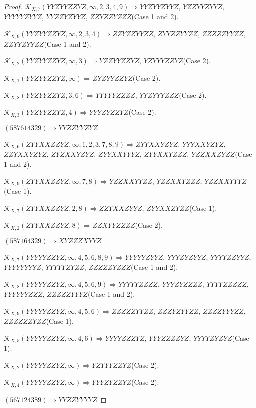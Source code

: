 \documentclass[12pt]{article}
\theoremstyle{plain}
\theoremstyle{definition}
\theoremstyle{remark}
\newcommand{\fancy}[1]{\mathcal{#1}}
\def\K{\fancy{K}}
\begin{document}
\begin{proof}
	$\K_{X,7}(YYZYYZZYZ,\infty,2, 3, 4, 9)\Rightarrow $$YYZYYZYYZ$, $YZZYYZYYZ$, $YYYYYZYYZ$, $YYZZYZYYZ$, $ZZYZZYZZZ$(Case 1 and 2).
	
	$\K_{X,9}(YYZYYZZYZ,\infty,2, 3, 4)\Rightarrow $$ZZYZZYYZZ$, $ZYYZZYYZZ$, $ZZZZZYYZZ$, $ZZYYZYYZZ$(Case 1 and 2).
	
	$\K_{X,2}(YYZYYZZYZ,\infty,3)\Rightarrow $$YZZYYZZYZ$, $YZYYYZZYZ$(Case 2).
	
	$\K_{X,1}(YYZYYZZYZ,\infty)\Rightarrow $$ZYZYYZZYZ$(Case 2).
	
	$\K_{X,8}(YYZYYZZYZ,3, 6)\Rightarrow $$YYYYYZZZZ$, $YYZYYYZZZ$(Case 2).
	
	$\K_{X,3}(YYZYYZZYZ,4)\Rightarrow $$YYYZYZZYZ$(Case 2).
	
	
	
	$(5 8 7 6 1 4 3 2 9)\Rightarrow YYZZYYZYZ$
	
	
	
	$\K_{X,6}(ZYYXXZZYZ,\infty,1, 2, 3, 7, 8, 9)\Rightarrow $$ZYYXXYZYZ$, $YYYXXYZYZ$, $ZZYXXYZYZ$, $ZYZXXYZYZ$, $ZYYXXYYYZ$, $ZYYXXYZZZ$, $YZZXXZYZZ$(Case 1 and 2).
	
	$\K_{X,9}(ZYYXXZZYZ,\infty,7, 8)\Rightarrow $$YZZXXYYZZ$, $YZZXXYZZZ$, $YZZXXYYYZ$(Case 1).
	
	$\K_{X,7}(ZYYXXZZYZ,2, 8)\Rightarrow $$ZZYXXZYYZ$, $ZYYXXZYZZ$(Case 1).
	
	$\K_{X,2}(ZYYXXZZYZ,8)\Rightarrow $$ZZXYYZZZZ$(Case 2).
	
	
	
	$(5 8 7 1 6 4 3 2 9)\Rightarrow XYZZZXYYZ$
	
	
	
	$\K_{X,7}(YYYYYZZYZ,\infty,4, 5, 6, 8, 9)\Rightarrow $$YYYYYZYYZ$, $YYYZYZYYZ$, $YYYYZZYYZ$, $YYYYYYYYZ$, $YYYYYZYZZ$, $ZZZZZYZZZ$(Case 1 and 2).
	
	$\K_{X,8}(YYYYYZZYZ,\infty,4, 5, 6, 9)\Rightarrow $$YYYYYZZZZ$, $YYYZYZZZZ$, $YYYYZZZZZ$, $YYYYYYZZZ$, $ZZZZZYYYZ$(Case 1 and 2).
	
	$\K_{X,9}(YYYYYZZYZ,\infty,4, 5, 6)\Rightarrow $$ZZZZZYYZZ$, $ZZZYZYYZZ$, $ZZZZYYYZZ$, $ZZZZZZYZZ$(Case 1).
	
	$\K_{X,5}(YYYYYZZYZ,\infty,4, 6)\Rightarrow $$YYYYZZZYZ$, $YYYZZZZYZ$, $YYYYZYZYZ$(Case 1).
	
	$\K_{X,2}(YYYYYZZYZ,\infty)\Rightarrow $$YZYYYZZYZ$(Case 2).
	
	$\K_{X,4}(YYYYYZZYZ,\infty)\Rightarrow $$YYYZYZZYZ$(Case 2).
	
	
	
	$(5 6 7 1 2 4 3 8 9)\Rightarrow YYZZYYYYZ$
	

\end{proof}
\end{document}
